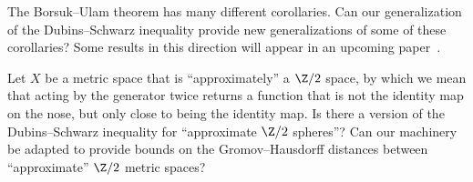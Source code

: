 \documentclass[11pt, reqno, english]{amsart}
\begin{document}
\begin{question}
\label{ques:DSgen-BU}
The Borsuk--Ulam theorem has many different corollaries.
Can our generalization of the Dubins--Schwarz inequality provide new generalizations of some of these corollaries?
Some results in this direction will appear in an upcoming paper~\cite{adams2022quantifying}.
\end{question}

\begin{question}
\label{ques:approx-Z2}
Let $X$ be a metric space that is ``approximately'' a $\Z/2$ space, by which we mean that acting by the generator twice returns a function that is not the identity map on the nose, but only close to being the identity map.
Is there a version of the Dubins--Schwarz inequality for ``approximate $\Z/2$ spheres''?
Can our machinery be adapted to provide bounds on the Gromov--Hausdorff distances between ``approximate'' $\Z/2$ metric spaces?
\end{question}
\end{document}
